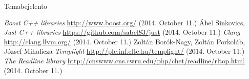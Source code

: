 \documentclass[a4paper,12pt]{report}
\begin{document}




\vspace*{\fill}
\begin{center}
Temabejelento
\end{center}
\vfill
\thispagestyle{empty}
\newpage
\setcounter{page}{1}

\tableofcontents









\begin{thebibliography}{9}
    \textit{Boost C++ libraries}
    \url{http://www.boost.org/} (2014. October 11.)
    Ábel Sinkovics, \textit{Just C++ libraries}
    \url{https://github.com/sabel83/just} (2014. October 11.)
    \textit{Clang}
    \url{http://clang.llvm.org/} (2014. October 11.)
    Zoltán Borók-Nagy, Zoltán Porkoláb, József Mihalicza
    \textit{Templight}
    \url{http://plc.inf.elte.hu/templight/} (2014. October 11.)
    \textit{The Readline library}
    \url{http://cnswww.cns.cwru.edu/php/chet/readline/rltop.html}
    (2014. October 11.)
\end{thebibliography}
\end{document}
